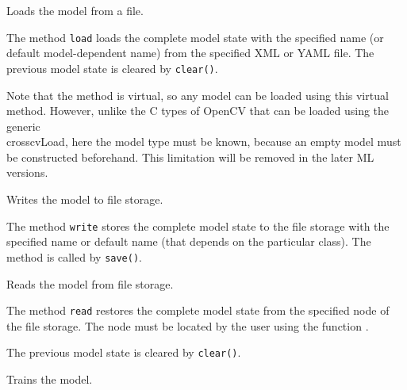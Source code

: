Loads the model from a file.


The method \texttt{load} loads the complete model state with the specified name (or default model-dependent name) from the specified XML or YAML file. The previous model state is cleared by \texttt{clear()}.

Note that the method is virtual, so any model can be loaded using this virtual method. However, unlike the C types of OpenCV that can be loaded using the generic \\cross{cvLoad}, here the model type must be known, because an empty model must be constructed beforehand. This limitation will be removed in the later ML versions.


Writes the model to file storage.


The method \texttt{write} stores the complete model state to the file storage with the specified name or default name (that depends on the particular class). The method is called by \texttt{save()}.


Reads the model from file storage.


The method \texttt{read} restores the complete model state from the specified node of the file storage. The node must be located by the user using the function .

The previous model state is cleared by \texttt{clear()}.


Trains the model.


